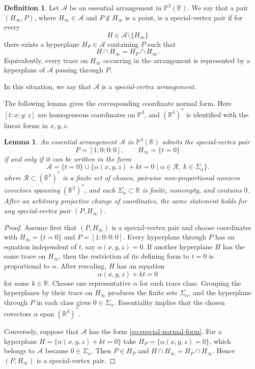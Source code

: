 \documentclass[11pt]{article}
\newtheorem{lemma}[theorem]{Lemma}
\theoremstyle{definition}
\newtheorem{definition}[theorem]{Definition}
\theoremstyle{remark}
\newcommand{\PP}{\mathbb P}
\newcommand{\RR}{\mathbb R}
\newcommand{\cA}{\mathcal A}
\begin{document}
\begin{definition}\label{def:special}
Let $\cA$ be an essential arrangement in $\PP^3(\RR)$.  We say that a pair $(H_\infty,P)$, where $H_\infty\in\mathcal A$ and
$P\not \in H_\infty$ is a point, is a special-vertex
pair if for every
\[
H\in\mathcal A\setminus\{H_\infty\}
\]
there exists a hyperplane $H_P\in\mathcal A$ containing $P$ such that
\[
H\cap H_\infty=H_P\cap H_\infty.
\]
Equivalently, every trace on $H_\infty$ occurring in the arrangement
is represented by a hyperplane of $\mathcal A$ passing through $P$.

In this situation, we say that $\cA$ is a \emph{special-vertex arrangement}.
\end{definition}

The following lemma gives the corresponding coordinate normal form.  Here
$[t:x:y:z]$ are homogeneous coordinates on $\PP^3$, and
$(\RR^3)^*$ is identified with the linear forms in $x,y,z$.

\begin{lemma}\label{lem:intrinsic-special-vertex}
An essential arrangement $\cA$ in $\PP^3(\RR)$ admits the
special-vertex pair
\[
 P=[1:0:0:0],\qquad H_\infty=\{t=0\}
\]
if and only if it can be written in the form
\begin{equation}
 \cA
 =\{t=0\}\cup
 \{\alpha(x,y,z)+kt=0\mid \alpha\in\mathcal R,\ k\in\Sigma_\alpha\}.
\label{eq:special-normal-form}
\end{equation}
where $\mathcal R\subset(\RR^3)^*$ is a finite set of chosen,
pairwise non-proportional nonzero covectors spanning $(\RR^3)^*$, and
each $\Sigma_\alpha\subset\RR$ is finite, nonempty, and contains $0$.
After an arbitrary projective change of coordinates, the same statement
holds for any special-vertex pair $(P,H_\infty)$.
\end{lemma}

\begin{proof}
Assume first that $(P,H_\infty)$ is a special-vertex pair and choose
coordinates with $H_\infty=\{t=0\}$ and $P=[1:0:0:0]$.  Every hyperplane
through $P$ has an equation independent of $t$, say
$\alpha(x,y,z)=0$.  If another hyperplane $H$ has the same trace on
$H_\infty$, then the restriction of its defining form to $t=0$ is
proportional to $\alpha$.  After rescaling, $H$ has an equation
\[
 \alpha(x,y,z)+kt=0
\]
for some $k\in\RR$.  Choose one representative $\alpha$ for each trace
class.  Grouping the hyperplanes by their trace on $H_\infty$ produces
the finite sets $\Sigma_\alpha$, and the hyperplane through $P$ in each
class gives $0\in\Sigma_\alpha$.  Essentiality implies that the chosen
covectors $\alpha$ span $(\RR^3)^*$.

Conversely, suppose that $\cA$ has the form \eqref{eq:special-normal-form}.
For a hyperplane
$H=\{\alpha(x,y,z)+kt=0\}$ take
$H_P=\{\alpha(x,y,z)=0\}$, which belongs to $\cA$ because
$0\in\Sigma_\alpha$.  Then $P\in H_P$ and
$H\cap H_\infty=H_P\cap H_\infty$.  Hence $(P,H_\infty)$ is a
special-vertex pair.
\end{proof}
\end{document}
